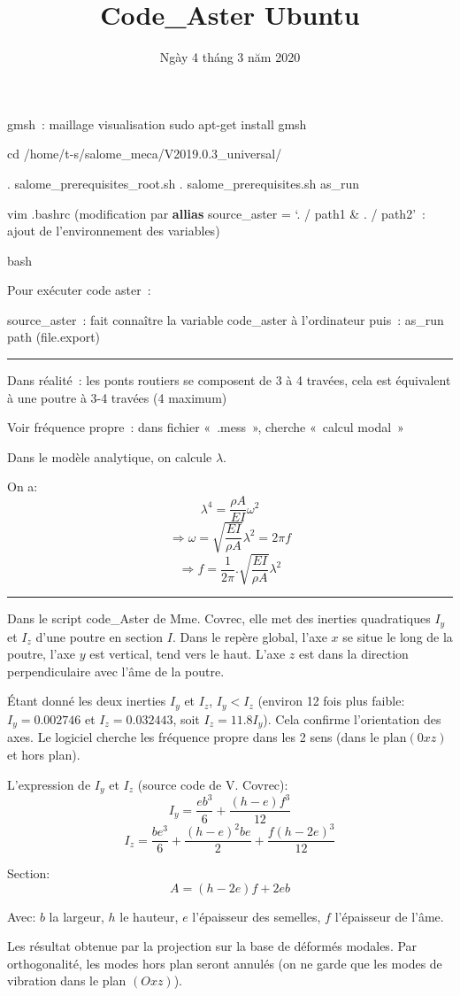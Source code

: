 \documentclass[12pt]{article}
\title{Code\_Aster Ubuntu}
\date{Ngày 4 tháng 3 năm 2020}
\begin{document}
	\maketitle

	gmsh : maillage visualisation
	sudo apt-get install gmsh
	
	cd /home/t-s/salome\_meca/V2019.0.3\_universal/
	
	. salome\_prerequisites\_root.sh 
	. salome\_prerequisites.sh 
	as\_run 
	
	vim .bashrc
	(modification par \textbf{allias} source\_aster = ‘. / path1 \& . / path2’ : ajout de l’environnement des variables)
	
	bash
	
	Pour exécuter code aster :
	
	source\_aster : fait connaître la variable code\_aster à l’ordinateur
	puis :
	as\_run path (file.export) \\
	
	\noindent\rule{18.5cm}{0.4pt}
	\linebreak
	
	Dans réalité : les ponts routiers se composent de 3 à 4 travées, cela est équivalent à une poutre à 3-4 travées (4 maximum)
	
	Voir fréquence propre : dans fichier « .mess », cherche « calcul modal »
	
	Dans le modèle analytique, on calcule $\lambda$.
	
	On a:
	$$\lambda^4 = \frac{\rho A}{EI} \omega^2$$
	$$\Rightarrow \omega = \sqrt{\frac{EI}{\rho A}} \lambda ^2 = 2 \pi f $$
	$$\Rightarrow f = \frac{1}{2 \pi}.\sqrt{\frac{EI}{\rho A}} \lambda ^2 $$
	
	\noindent\rule{18.5cm}{0.4pt}
	\linebreak
	
	Dans le script code\_Aster de Mme. Covrec, elle met des inerties quadratiques $I_y$ et $I_z$ d'une poutre en section $I$. Dans le repère global, l'axe $x$ se situe le long de la poutre, l'axe $y$ est vertical, tend vers le haut. L'axe $z$ est dans la direction perpendiculaire avec l'âme de la poutre.
	
	Étant donné les deux inerties $I_y$ et $I_z$, $I_y < I_z$ (environ 12 fois plus faible: $I_y = 0.002746$ et $I_z = 0.032443$, soit $I_z = 11.8 I_y$). Cela confirme l'orientation des axes. Le logiciel cherche les fréquence propre dans les 2 sens (dans le plan$(0xz)$ et hors plan).
	
	L'expression de $I_y$ et $I_z$ (source code de V. Covrec):
	$$I_y = \frac{eb^3}{6} + \frac{(h-e)f^3}{12} $$
	$$I_z = \frac{be^3}{6} + \frac{(h-e)^2be}{2} +\frac{f(h-2e)^3}{12}$$
	
	Section:
	$$A = (h-2e)f + 2eb$$
	
	Avec:
	$b$ la largeur, $h$ le hauteur, $e$ l'épaisseur des semelles, $f$ l'épaisseur de l'âme.
	
	Les résultat obtenue par la projection sur la base de déformés modales. Par orthogonalité, les modes hors plan seront annulés (on ne garde que les modes de vibration dans le plan $(Oxz)$).
	
	
\end{document}

